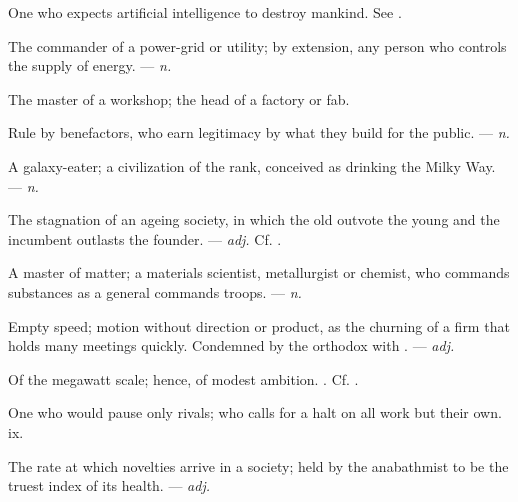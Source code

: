   One who expects artificial intelligence to destroy mankind. See .

 The commander of a power-grid or utility; by extension, any person who controls the supply of energy. ---  \textit{n.}

 The master of a workshop; the head of a factory or fab.

 Rule by benefactors, who earn legitimacy by what they build for the public.
  ---  \textit{n.}

 A galaxy-eater; a civilization of the  rank, conceived as drinking the Milky Way. ---  \textit{n.}

 The stagnation of an ageing society, in which the old outvote the young and the incumbent outlasts the founder. ---  \textit{adj.} Cf. .

 A master of matter; a materials scientist, metallurgist or chemist, who commands substances as a general commands troops. ---  \textit{n.}

 Empty speed; motion without direction or product, as the churning of a firm that holds many meetings quickly. Condemned by the orthodox with . ---  \textit{adj.}

 Of the megawatt scale; hence,  of modest ambition. . Cf. .

 One who would pause only rivals; who calls for a halt on all work but their own.   ix.

 The rate at which novelties arrive in a society; held by the anabathmist to be the truest index of its health. ---  \textit{adj.}

